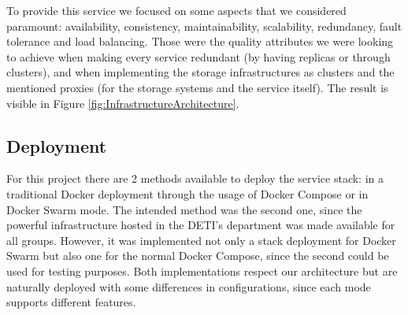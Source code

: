 \documentclass[12pt]{article}
\begin{document}
To provide this service we focused on some aspects that we considered paramount: availability, consistency, maintainability, scalability, redundancy, fault 
tolerance and load balancing. 
Those were the quality attributes we were looking to achieve when making every service redundant (by having replicas or through clusters), and when implementing 
the storage infrastructures as clusters and the mentioned proxies (for the storage systems and the service itself).
The result is visible in Figure \ref{fig:InfrastructureArchitecture}.

\subsection{Deployment} \label{strategy.deployment} %


For this project there are 2 methods available to deploy the service stack: in a traditional Docker deployment through the usage of Docker Compose or in Docker 
Swarm mode.
The intended method was the second one, since the powerful infrastructure hosted in the DETI's department was made available for all groups. 
However, it was implemented not only a stack deployment for Docker Swarm but also one for the normal Docker Compose, since the second could be used for testing 
purposes. 
Both implementations respect our architecture but are naturally deployed with some differences in configurations, since each mode supports different features.
\end{document}
